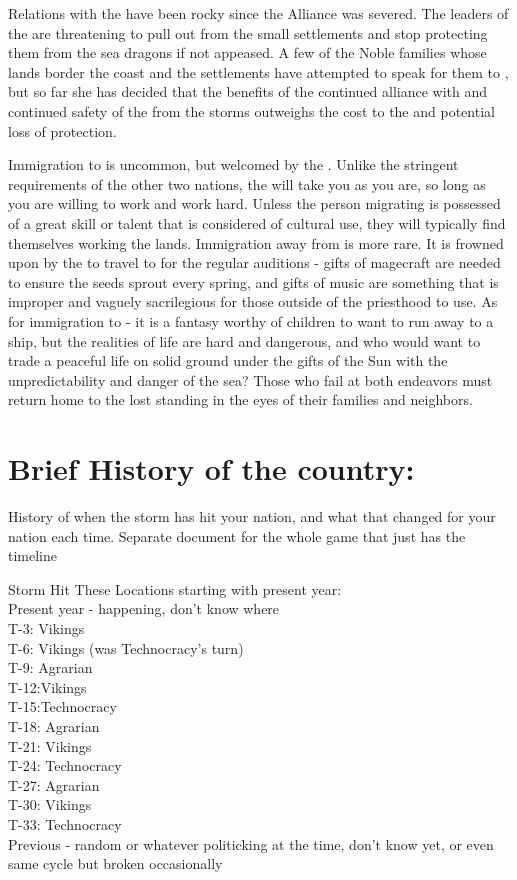 \documentclass[blue]{GL2020}
\begin{document}
Relations with the \pVikings{} have been rocky since the Alliance was severed.  The leaders of the \pVikings{} are threatening to pull out from the small settlements and stop protecting them from the sea dragons if not appeased.  A few of the Noble families whose lands border the coast and the \pVikings{} settlements have attempted to speak for them to \cQueen{}, but so far she has decided that the benefits of the continued alliance with \pCreators{} and continued safety of the \pSunCh{} from the storms outweighs the cost to the \pVikings{} and potential loss of protection.

Immigration to \pSun{} is uncommon, but welcomed by the \pSunCh{}.  Unlike the stringent requirements of the other two nations, the \pSunCh{} will take you as you are, so long as you are willing to work and work hard.  Unless the person migrating is possessed of a great skill or talent that is considered of cultural use, they will typically find themselves working the lands.  Immigration away from \pSun{} is more rare.  It is frowned upon by the \pSunCh{} to travel to \pCreators{} for the regular auditions - gifts of magecraft are needed to ensure the seeds sprout every spring, and gifts of music are something that is improper and vaguely sacrilegious for those outside of the priesthood to use.  As for immigration to \pVikings{} - it is a fantasy worthy of children to want to run away to a \pVikings{} ship, but the realities of \pVikings{} life are hard and dangerous, and who would want to trade a peaceful life on solid ground under the gifts of the Sun with the unpredictability and danger of the sea?  Those who fail at both endeavors must return home to the lost standing in the eyes of their families and neighbors.

\section*{Brief History of the country:}

History of when the storm has hit your nation, and what that changed for your nation each time.
Separate document for the whole game that just has the timeline

Storm Hit These Locations starting with present year:\\
Present year - happening, don’t know where\\
T-3: Vikings\\
T-6: Vikings (was Technocracy’s turn)\\
T-9: Agrarian\\
T-12:Vikings\\
T-15:Technocracy\\
T-18: Agrarian\\
T-21: Vikings\\
T-24: Technocracy\\
T-27: Agrarian\\
T-30: Vikings\\
T-33: Technocracy\\
Previous - random or whatever politicking at the time, don’t know yet, or even same cycle but broken occasionally\\
\end{document}
